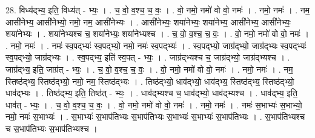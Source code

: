 \documentclass[17pt]{extarticle}
\begin{document}
28. विध्य॑द्भ्य॒ इति॒ विध्य॑त् - भ्यः॒ । . च॒ वो॒ व॒श्च॒ च॒ वः॒ । . वो॒ नमो॒ नमो॑ वो वो॒ नमः॑ । . नमो॒ नमः॑ । . नम॒ आसी॑नेभ्य॒ आसी॑नेभ्यो॒ नमो॒ नम॒ आसी॑नेभ्यः । . आसी॑नेभ्यः॒ शया॑नेभ्यः॒ शया॑नेभ्य॒ आसी॑नेभ्य॒ आसी॑नेभ्यः॒ शया॑नेभ्यः । . शया॑नेभ्यश्च च॒ शया॑नेभ्यः॒ शया॑नेभ्यश्च । . च॒ वो॒ व॒श्च॒ च॒ वः॒ । . वो॒ नमो॒ नमो॑ वो वो॒ नमः॑ । . नमो॒ नमः॑ । . नमः॑ स्व॒पद्भ्यः॑ स्व॒पद्भ्यो॒ नमो॒ नमः॑ स्व॒पद्भ्यः॑ । . स्व॒पद्भ्यो॒ जाग्र॑द्भ्यो॒ जाग्र॑द्भ्यः स्व॒पद्भ्यः॑ स्व॒पद्भ्यो॒ जाग्र॑द्भ्यः । . स्व॒पद्भ्य॒ इति॑ स्व॒पत् - भ्यः॒ । . जाग्र॑द्भ्यश्च च॒ जाग्र॑द्भ्यो॒ जाग्र॑द्भ्यश्च । . जाग्र॑द्भ्य॒ इति॒ जाग्र॑त् - भ्यः॒ । . च॒ वो॒ व॒श्च॒ च॒ वः॒ । . वो॒ नमो॒ नमो॑ वो वो॒ नमः॑ । . नमो॒ नमः॑ । . नम॒ स्तिष्ठ॑द्भ्य॒ स्तिष्ठ॑द्भ्यो॒ नमो॒ नम॒ स्तिष्ठ॑द्भ्यः । . तिष्ठ॑द्भ्यो॒ धाव॑द्भ्यो॒ धाव॑द्भ्य॒ स्तिष्ठ॑द्भ्य॒ स्तिष्ठ॑द्भ्यो॒ धाव॑द्भ्यः । . तिष्ठ॑द्भ्य॒ इति॒ तिष्ठ॑त् - भ्यः॒ । . धाव॑द्भ्यश्च च॒ धाव॑द्भ्यो॒ धाव॑द्भ्यश्च । . धाव॑द्भ्य॒ इति॒ धाव॑त् - भ्यः॒ । . च॒ वो॒ व॒श्च॒ च॒ वः॒ । . वो॒ नमो॒ नमो॑ वो वो॒ नमः॑ । . नमो॒ नमः॑ । . नमः॑ स॒भाभ्यः॑ स॒भाभ्यो॒ नमो॒ नमः॑ स॒भाभ्यः॑ । . स॒भाभ्यः॑ स॒भाप॑तिभ्यः स॒भाप॑तिभ्यः स॒भाभ्यः॑ स॒भाभ्यः॑ स॒भाप॑तिभ्यः । . स॒भाप॑तिभ्यश्च च स॒भाप॑तिभ्यः स॒भाप॑तिभ्यश्च । \newline
\end{document}
